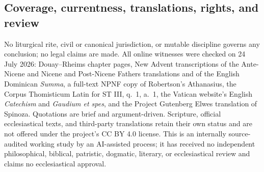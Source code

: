 \subsection{Coverage, currentness, translations, rights, and review}

No liturgical rite, civil or canonical jurisdiction, or mutable discipline governs any conclusion; no legal claims are made. All online witnesses were checked on 24 July 2026: Douay--Rheims chapter pages, New Advent transcriptions of the Ante-Nicene and Nicene and Post-Nicene Fathers translations and of the English Dominican \emph{Summa}, a full-text NPNF copy of Robertson's Athanasius, the Corpus Thomisticum Latin for ST III, q.~1, a.~1, the Vatican website's English \emph{Catechism} and \emph{Gaudium et spes}, and the Project Gutenberg Elwes translation of Spinoza. Quotations are brief and argument-driven. Scripture, official ecclesiastical texts, and third-party translations retain their own status and are not offered under the project's CC BY 4.0 license. This is an internally source-audited working study by an AI-assisted process; it has received no independent philosophical, biblical, patristic, dogmatic, literary, or ecclesiastical review and claims no ecclesiastical approval.
